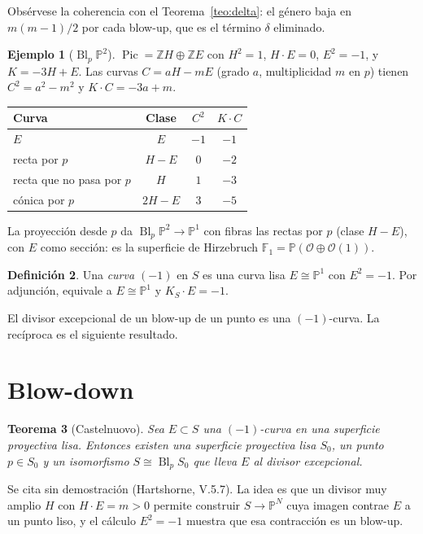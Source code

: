 \documentclass[11pt,a4paper,oneside]{book}
\newcommand{\Bl}{\operatorname{Bl}}
\newcommand{\Pic}{\operatorname{Pic}}
\newcommand{\PP}{\mathbb{P}}
\newcommand{\ZZ}{\mathbb{Z}}
\newcommand{\cO}{\mathcal{O}}
\theoremstyle{plain}
\newtheorem{teorema}{Teorema}[chapter]
\theoremstyle{definition}
\newtheorem{definicion}[teorema]{Definición}
\newtheorem{ejemplo}[teorema]{Ejemplo}
\theoremstyle{remark}
\begin{document}
Obsérvese la coherencia con el Teorema~\ref{teo:delta}: el género baja en $m(m-1)/2$ por cada blow-up, que es el término $\delta$ eliminado.

\begin{ejemplo}[$\Bl_p\PP^2$]\label{ej:blP2}
$\Pic=\ZZ H\oplus\ZZ E$ con $H^2=1$, $H\cdot E=0$, $E^2=-1$, y $K=-3H+E$. Las curvas $C=aH-mE$ (grado $a$, multiplicidad $m$ en $p$) tienen $C^2=a^2-m^2$ y $K\cdot C=-3a+m$.
\begin{center}
\begin{tabular}{lccc}
\toprule
Curva & Clase & $C^2$ & $K\cdot C$ \\
\midrule
$E$ & $E$ & $-1$ & $-1$ \\
recta por $p$ & $H-E$ & $0$ & $-2$ \\
recta que no pasa por $p$ & $H$ & $1$ & $-3$ \\
cónica por $p$ & $2H-E$ & $3$ & $-5$ \\
\bottomrule
\end{tabular}
\end{center}
La proyección desde $p$ da $\Bl_p\PP^2\to\PP^1$ con fibras las rectas por $p$ (clase $H-E$), con $E$ como sección: es la superficie de Hirzebruch $\mathbb F_1=\PP(\cO\oplus\cO(1))$.
\end{ejemplo}

\begin{definicion}
Una \emph{curva $(-1)$} en $S$ es una curva lisa $E\cong\PP^1$ con $E^2=-1$. Por adjunción, equivale a $E\cong\PP^1$ y $K_S\cdot E=-1$.
\end{definicion}

El divisor excepcional de un blow-up de un punto es una $(-1)$-curva. La recíproca es el siguiente resultado.

\section{Blow-down}

\begin{teorema}[Castelnuovo]\label{teo:castelnuovo}
Sea $E\subset S$ una $(-1)$-curva en una superficie proyectiva lisa. Entonces existen una superficie proyectiva lisa $S_0$, un punto $p\in S_0$ y un isomorfismo $S\cong\Bl_pS_0$ que lleva $E$ al divisor excepcional.
\end{teorema}

Se cita sin demostración (Hartshorne, V.5.7). La idea es que un divisor muy amplio $H$ con $H\cdot E=m>0$ permite construir $S\to\PP^N$ cuya imagen contrae $E$ a un punto liso, y el cálculo $E^2=-1$ muestra que esa contracción es un blow-up.
\end{document}
